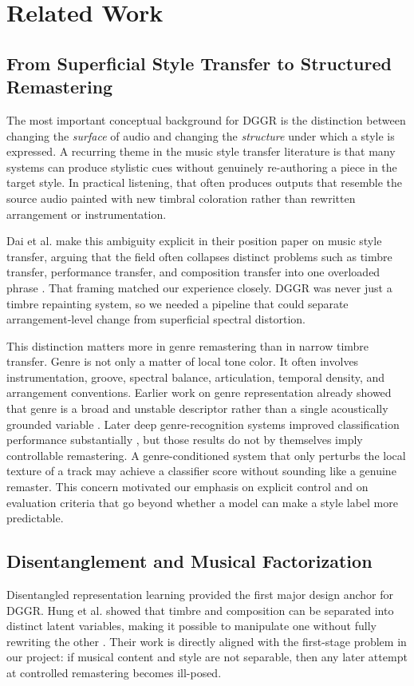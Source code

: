 \documentclass[conference]{IEEEtran}
\begin{document}
\section{Related Work}
\subsection{From Superficial Style Transfer to Structured Remastering}
The most important conceptual background for DGGR is the distinction between changing the \emph{surface} of audio and changing the \emph{structure} under which a style is expressed. A recurring theme in the music style transfer literature is that many systems can produce stylistic cues without genuinely re-authoring a piece in the target style. In practical listening, that often produces outputs that resemble the source audio painted with new timbral coloration rather than rewritten arrangement or instrumentation.

Dai et al. make this ambiguity explicit in their position paper on music style transfer, arguing that the field often collapses distinct problems such as timbre transfer, performance transfer, and composition transfer into one overloaded phrase \cite{dai2018}. That framing matched our experience closely. DGGR was never just a timbre repainting system, so we needed a pipeline that could separate arrangement-level change from superficial spectral distortion.

This distinction matters more in genre remastering than in narrow timbre transfer. Genre is not only a matter of local tone color. It often involves instrumentation, groove, spectral balance, articulation, temporal density, and arrangement conventions. Earlier work on genre representation already showed that genre is a broad and unstable descriptor rather than a single acoustically grounded variable \cite{aucouturier2003}. Later deep genre-recognition systems improved classification performance substantially \cite{ghosal2018}, but those results do not by themselves imply controllable remastering. A genre-conditioned system that only perturbs the local texture of a track may achieve a classifier score without sounding like a genuine remaster. This concern motivated our emphasis on explicit control and on evaluation criteria that go beyond whether a model can make a style label more predictable.

\subsection{Disentanglement and Musical Factorization}
Disentangled representation learning provided the first major design anchor for DGGR. Hung et al. showed that timbre and composition can be separated into distinct latent variables, making it possible to manipulate one without fully rewriting the other \cite{hung2019}. Their work is directly aligned with the first-stage problem in our project: if musical content and style are not separable, then any later attempt at controlled remastering becomes ill-posed.
\end{document}
